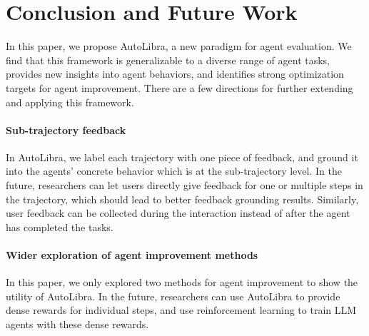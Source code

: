 \section{Conclusion and Future Work}
In this paper, we propose AutoLibra, a new paradigm for agent evaluation.
We find that this framework is generalizable to a diverse range of agent tasks, provides new insights into agent behaviors,
and identifies strong optimization targets for agent improvement. There are a few directions for further extending and applying this framework. 

\paragraph{Sub-trajectory feedback} In AutoLibra, we label each trajectory with one piece of feedback, and ground it into the agents' concrete behavior which is at the sub-trajectory level. In the future, researchers can let users directly give feedback for one or multiple steps in the trajectory, which should lead to better feedback grounding results. Similarly, user feedback can be collected during the interaction instead of after the agent has completed the tasks. 

\paragraph{Wider exploration of  agent improvement methods} In this paper, we only explored two methods for agent improvement to show the utility of AutoLibra. In the future, researchers can use AutoLibra to provide dense rewards for individual steps, and use reinforcement learning to train LLM agents with these dense rewards. 
